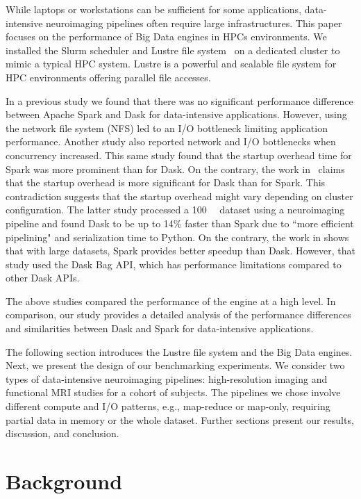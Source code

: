 \documentclass[conference]{IEEEtran}
\begin{document}
While laptops or workstations can be sufficient for some applications, data-intensive neuroimaging pipelines often require large infrastructures.
This paper focuses on the performance of Big Data engines in HPCs environments.
We installed the Slurm scheduler and Lustre file system~\cite{braam2019lustre} on a dedicated cluster to mimic a typical HPC system.
Lustre is a powerful and scalable file system for HPC environments offering parallel file accesses.

In a previous study\cite{8943502} we found that there was no significant performance difference between Apache Spark and Dask for data-intensive applications.
However, using the network file system (NFS) led to an I/O bottleneck limiting application performance.
Another study \cite{8588652} also reported network and I/O bottlenecks when concurrency increased.
This same study found that the startup overhead time for Spark was more prominent than for Dask.
On the contrary, the work in~\cite{Mehta:17} claims that the startup overhead is more significant for Dask than for Spark.
This contradiction suggests that the startup overhead might vary depending on cluster configuration.
The latter study processed a \SI{100}{\giga\byte} dataset using a neuroimaging pipeline and found Dask to be up to 14\% faster than Spark due to ``more efficient pipelining" and serialization time to Python.
On the contrary, the work in \cite{10.1145/3225058.3225128} shows that with large datasets, Spark provides better speedup than Dask.
However, that study used the Dask Bag API, which has performance limitations compared to other Dask APIs.

The above studies compared the performance of the engine at a high level.
In comparison, our study provides a detailed analysis of the performance differences and similarities between Dask and Spark for data-intensive applications.

The following section introduces the Lustre file system and the Big Data engines.
Next, we present the design of our benchmarking experiments.
We consider two types of data-intensive neuroimaging pipelines: high-resolution imaging and functional MRI studies for a cohort of subjects.
The pipelines we chose involve different compute and I/O patterns, e.g., map-reduce or map-only, requiring partial data in memory or the whole dataset.
Further sections present our results, discussion, and conclusion.


\section{Background}
\end{document}
